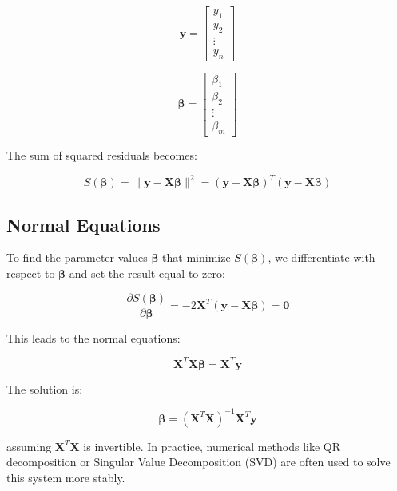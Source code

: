 \documentclass[12pt]{article}
\begin{document}
\begin{equation}
\mathbf{y} = \begin{bmatrix} y_1 \\ y_2 \\ \vdots \\ y_n \end{bmatrix}
\end{equation}

\begin{equation}
\boldsymbol{\beta} = \begin{bmatrix} \beta_1 \\ \beta_2 \\ \vdots \\ \beta_m \end{bmatrix}
\end{equation}

The sum of squared residuals becomes:

\begin{equation}
S(\boldsymbol{\beta}) = \|\mathbf{y} - \mathbf{X}\boldsymbol{\beta}\|^2 = (\mathbf{y} - \mathbf{X}\boldsymbol{\beta})^T(\mathbf{y} - \mathbf{X}\boldsymbol{\beta})
\end{equation}

\subsection{Normal Equations}

To find the parameter values $\boldsymbol{\beta}$ that minimize $S(\boldsymbol{\beta})$, we differentiate with respect to $\boldsymbol{\beta}$ and set the result equal to zero:

\begin{equation}
\frac{\partial S(\boldsymbol{\beta})}{\partial \boldsymbol{\beta}} = -2\mathbf{X}^T(\mathbf{y} - \mathbf{X}\boldsymbol{\beta}) = \mathbf{0}
\end{equation}

This leads to the normal equations:

\begin{equation}
\mathbf{X}^T\mathbf{X}\boldsymbol{\beta} = \mathbf{X}^T\mathbf{y}
\end{equation}

The solution is:

\begin{equation}
\boldsymbol{\beta} = (\mathbf{X}^T\mathbf{X})^{-1}\mathbf{X}^T\mathbf{y}
\end{equation}

assuming $\mathbf{X}^T\mathbf{X}$ is invertible. In practice, numerical methods like QR decomposition or Singular Value Decomposition (SVD) are often used to solve this system more stably.
\end{document}
